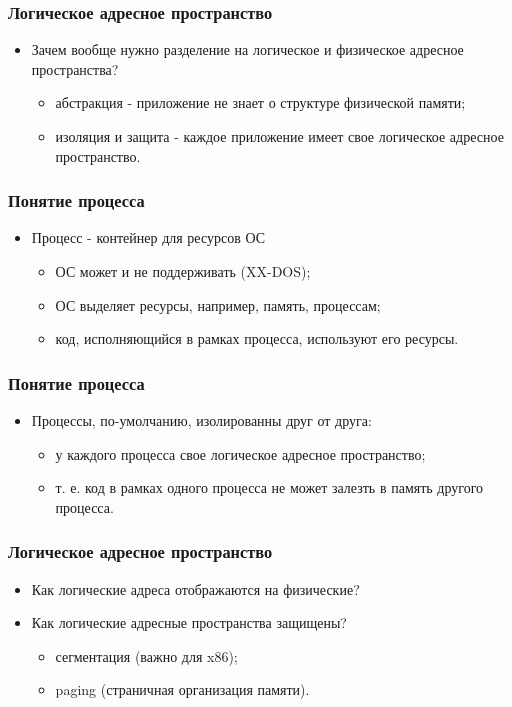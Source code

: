 \begin{frame}
\frametitle{Логическое адресное пространство}
\begin{itemize}
    \item<1->Зачем вообще нужно разделение на логическое и
    физическое адресное пространства?
    \begin{itemize}
        \item<2->абстракция - приложение не знает о структуре
        физической памяти;
        \item<3->изоляция и защита - каждое приложение имеет
        свое логическое адресное пространство.
    \end{itemize}
\end{itemize}
\end{frame}

\begin{frame}
\frametitle{Понятие процесса}
\begin{itemize}
    \item<1->Процесс - контейнер для ресурсов ОС
    \begin{itemize}
        \item<2->ОС может и не поддерживать (XX-DOS);
        \item<3->ОС выделяет ресурсы, например, память, процессам;
        \item<4->код, исполняющийся в рамках процесса, используют его ресурсы.
    \end{itemize}
\end{itemize}
\end{frame}

\begin{frame}
\frametitle{Понятие процесса}
\begin{itemize}
    \item<1->Процессы, по-умолчанию, изолированны друг от друга:
    \begin{itemize}
        \item<2->у каждого процесса свое логическое адресное пространство;
        \item<3->т. е. код в рамках одного процесса не может залезть
        в память другого процесса.
    \end{itemize}
\end{itemize}
\end{frame}

\begin{frame}
\frametitle{Логическое адресное пространство}
\begin{itemize}
   \item<1->Как логические адреса отображаются на физические?
   \item<1->Как логические адресные пространства защищены?
   \begin{itemize}
       \item<2->сегментация (важно для x86);
       \item<3->paging (страничная организация памяти).
   \end{itemize}
\end{itemize}
\end{frame}

